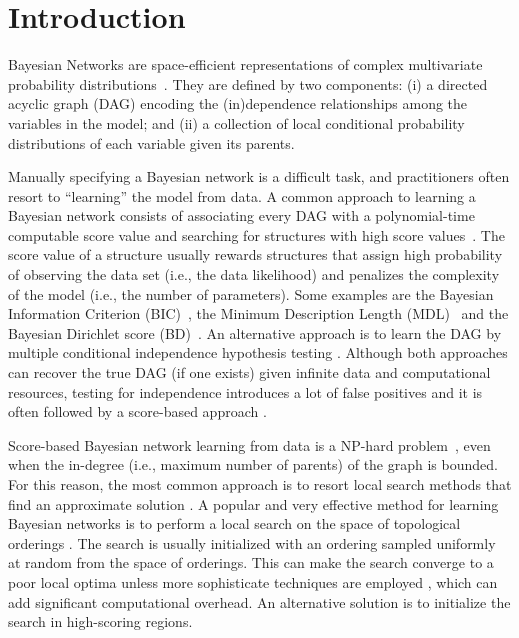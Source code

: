 \section{Introduction}
\label{sec:introduction}

Bayesian Networks are space-efficient representations of complex
multivariate probability distributions~\cite{VJensen01}. They are
defined by two components: (i) a directed acyclic graph (DAG) encoding the (in)dependence relationships among the variables in the model; and (ii) a collection of local conditional probability distributions of each variable given its parents.

Manually specifying a Bayesian network is a difficult task, and practitioners often resort to ``learning'' the model from data. A common approach to learning a Bayesian network consists of associating every DAG with a polynomial-time computable score value and searching for structures with high score values~\cite{Cooper92,MDL94,Margaritis03,TK05}. The score value of a structure usually rewards structures that assign high probability of observing the data set (i.e., the data likelihood) and penalizes the complexity of the model (i.e., the number of parameters). Some examples are the Bayesian Information Criterion (BIC)~\cite{BIC91}, the Minimum Description Length (MDL)~\cite{MDL94} and the Bayesian Dirichlet score (BD)~\cite{BD95}. An alternative approach is to learn the DAG by multiple conditional independence hypothesis testing \cite{Spirtes95,ci}. Although both approaches can recover the true DAG (if one exists) given infinite data and computational resources, testing for independence introduces a lot of false positives and it is often followed by a score-based approach \cite{maxmin}. 

Score-based Bayesian network learning from data is a NP-hard problem~\cite{MSResearch04}, even when the in-degree (i.e., maximum number of parents) of the graph is bounded. For this reason, the most common approach is to resort local search methods that find an approximate solution \cite{FNP99,Maxwell02}. A popular and very effective method for learning Bayesian networks is to perform a local search on the space of topological orderings \cite{TK05}. The search is usually initialized with an ordering sampled uniformly at random from the space of orderings. This can make the search converge to a poor local optima unless more sophisticate techniques are employed \cite{ENF02}, which can add significant computational overhead. An alternative solution is to initialize the search in high-scoring regions.


